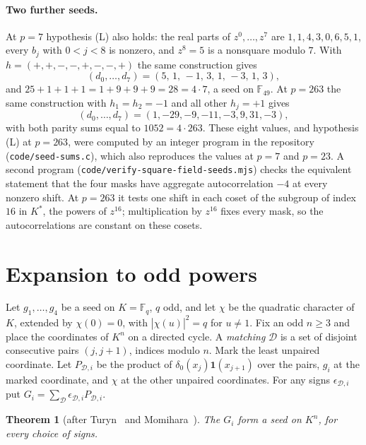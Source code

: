 \documentclass[11pt]{article}
\newtheorem{theorem}{Theorem}
\theoremstyle{remark}
\newcommand{\F}{\mathbb F}
\newcommand{\one}{\mathbf 1}
\begin{document}
\paragraph{Two further seeds.}
At $p=7$ hypothesis (L) also holds: the real parts of $z^0,\dots,z^7$ are $1,1,4,3,0,6,5,1$, every $b_j$ with $0<j<8$ is nonzero, and $z^8=5$ is a nonsquare modulo $7$. With $h=(+,+,-,-,+,-,-,+)$ the same construction gives
\[
(d_0,\dots,d_7)=(5,\,1,\,-1,\,3,\,1,\,-3,\,1,\,3),
\]
and $25+1+1+1=1+9+9+9=28=4\cdot7$, a seed on $\F_{49}$. At $p=263$ the same construction with $h_1=h_2=-1$ and all other $h_j=+1$ gives
\[
(d_0,\dots,d_7)=(1,-29,-9,-11,-3,9,31,-3),
\]
with both parity sums equal to $1052=4\cdot263$. These eight values, and hypothesis (L) at $p=263$, were computed by an integer program in the repository (\texttt{code/seed-sums.c}), which also reproduces the values at $p=7$ and $p=23$. A second program (\texttt{code/verify-square-field-seeds.mjs}) checks the equivalent statement that the four masks have aggregate autocorrelation $-4$ at every nonzero shift. At $p=263$ it tests one shift in each coset of the subgroup of index $16$ in $K^*$, the powers of $z^{16}$; multiplication by $z^{16}$ fixes every mask, so the autocorrelations are constant on these cosets.

\section{Expansion to odd powers}\label{sec:expansion}
Let $g_1,\dots,g_4$ be a seed on $K=\F_q$, $q$ odd, and let $\chi$ be the quadratic character of $K$, extended by $\chi(0)=0$, with $|\widehat\chi(u)|^2=q$ for $u\ne1$. Fix an odd $n\ge3$ and place the coordinates of $K^n$ on a directed cycle. A \emph{matching} $\mathcal D$ is a set of disjoint consecutive pairs $(j,j+1)$, indices modulo $n$. Mark the least unpaired coordinate. Let $P_{\mathcal D,i}$ be the product of $\delta_0(x_j)\one(x_{j+1})$ over the pairs, $g_i$ at the marked coordinate, and $\chi$ at the other unpaired coordinates. For any signs $\epsilon_{\mathcal D,i}$ put $G_i=\sum_{\mathcal D}\epsilon_{\mathcal D,i}P_{\mathcal D,i}$.

\begin{theorem}[after Turyn~\cite{Turyn71} and Momihara~\cite{Mom}]\label{transfer}
The $G_i$ form a seed on $K^n$, for every choice of signs.
\end{theorem}
\end{document}
